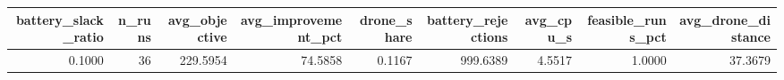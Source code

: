 \begin{tabular}{rrrrrrrrr}
\toprule
battery_slack_ratio & n_runs & avg_objective & avg_improvement_pct & drone_share & battery_rejections & avg_cpu_s & feasible_runs_pct & avg_drone_distance \\
\midrule
0.1000 & 36 & 229.5954 & 74.5858 & 0.1167 & 999.6389 & 4.5517 & 1.0000 & 37.3679 \\
\bottomrule
\end{tabular}
